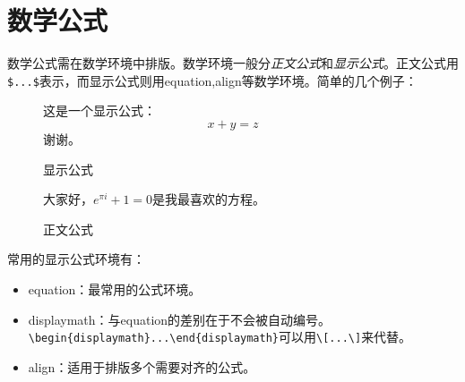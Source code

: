 ﻿
\chapter{数学公式}
\label{chap:math}
数学公式需在数学环境中排版。数学环境一般分\textit{正文公式}和\textit{显示公式}。正文公式用\verb|$...$|表示，而显示公式则用equation,align等数学环境。简单的几个例子：
\begin{figure}[ht]
\centering
{}
\hspace{0.1\textwidth}
\begin{minipage}[h]{0.4\textwidth}
\centering
\begin{code}
这是一个显示公式：
\begin{equation}
x+y=z
\end{equation}
谢谢。
\end{code}
\end{minipage}
\caption{显示公式}
\end{figure}
\begin{figure}[h]
\centering
{}
\hspace{0.1\textwidth}
\begin{minipage}[h]{0.4\textwidth}
\centering
\begin{code}
大家好，$e^{\pi i}+1=0$是我最喜欢的方程。
\end{code}
\end{minipage}
\caption{正文公式}
\end{figure}

常用的显示公式环境有：
\begin{itemize}
\item{equation}：最常用的公式环境。
\item{displaymath}：与equation的差别在于不会被自动编号。\\
\verb|\begin{displaymath}...\end{displaymath}|可以用\verb|\[...\]|来代替。
\item{align}：适用于排版多个需要对齐的公式。
\end{itemize}


